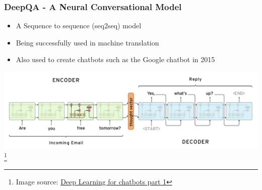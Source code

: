 \documentclass[handout]{beamer}      %
\begin{document}
\begin{frame}
    \frametitle{DeepQA - A Neural Conversational Model}
    \begin{itemize}
        \item A Sequence to sequence (seq2seq) model
        \item Being successfully used in machine translation
        \item Also used to create chatbots such as the Google chatbot in 2015
    \end{itemize}
    \includegraphics[width=\textwidth]{image01.png}\footnote{Image source: \href{http://www.wildml.com/2016/04/deep-learning-for-chatbots-part-1-introduction/}{Deep Learning for chatbots part 1}}
\end{frame}

\begin{frame}

\end{frame}
\end{document}
